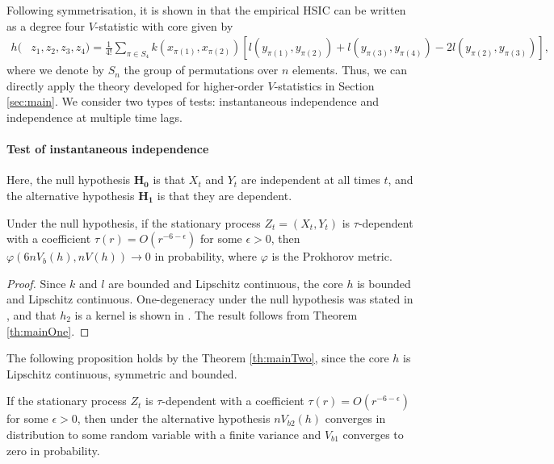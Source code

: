 Following symmetrisation, it is shown in \cite{gretton_kernel_2008,chwialkowski2014kernel} that the empirical HSIC can be written as a degree four $V$-statistic with core given by
\begin{align*}
h(&z_1,z_2,z_3,z_4) = \frac{1}{4!} \sum_{\pi \in S_4}  k(x_{\pi(1)},x_{\pi(2)}) [  l(y_{\pi(1)},y_{\pi(2)}) +  l(y_{\pi(3)},y_{\pi(4)}) - 2  l(y_{\pi(2)},y_{\pi(3)})],  
\end{align*}
where we denote by $S_n$ the group of permutations over $n$ elements. Thus, we can directly apply the theory developed for higher-order $V$-statistics in Section \ref{sec:main}. 
We consider two types of tests: instantaneous independence and independence at multiple time lags.

\paragraph{Test of instantaneous independence}
Here, the null hypothesis  $\mathbf{H_0}$ is that  $X_t$ and $Y_t$ are independent at all times $t$,  and the alternative hypothesis $\mathbf{H_1}$ is that they are dependent. 

\begin{proposition}
\label{prop:null}
Under the null hypothesis, if the stationary process $Z_t=\left(X_t,Y_t\right)$ is $\tau$-dependent with a coefficient $\tau(r) = O\left(r^{-6-\epsilon}\right)$ for some $\epsilon>0$, then $\varphi(6 n V_b(h),n V(h))\to 0$ in probability, where $\varphi$ is the Prokhorov metric. 
\end{proposition}
\begin{proof}
Since $k$ and $l$ are bounded and Lipschitz continuous, the core $h$ is bounded  and Lipschitz continuous. One-degeneracy under the null hypothesis was stated in \cite[Theorem 2]{gretton_kernel_2008}, and that $h_2$ is a kernel is shown in \cite[section A.2, following eq. (11)]{gretton_kernel_2008}. The result follows from Theorem \ref{th:mainOne}.
\end{proof}

The following proposition holds by the Theorem \ref{th:mainTwo}, since the core $h$ is  Lipschitz continuous, symmetric and bounded.
\begin{proposition}
\label{prop:alternative}
If the stationary process $Z_t$ is $\tau$-dependent with a coefficient $\tau(r) = O\left(r^{-6-\epsilon}\right)$ for some $\epsilon>0$, then under the alternative hypothesis $n V_{b2}(h)$ converges in distribution to some random variable with a finite variance and $ V_{b1}$ converges to zero in probability. 
\end{proposition}


